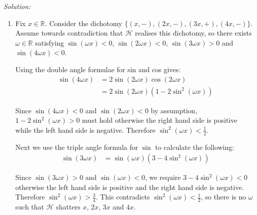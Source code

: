 \documentclass[
	10pt, %
	a4paper, %
	oneside, %
	headinclude,footinclude, %
	BCOR5mm, %
]{scrartcl}
\newenvironment{solution}
{\textit{Solution:}}
{}
\begin{document}
\begin{solution}
	\begin{enumerate}[label= (\alph*)]
		\item Fix $x\in\mathbb{R}$. Consider the dichotomy $\{(x, -), (2x, -), (3x, +), (4x, -)\}$. Assume towards contradiction that $\mathcal{H}$ realises this dichotomy, so there exists $\omega\in\mathbb{R}$ satisfying $\sin(\omega x) < 0$, $\sin(2 \omega x) < 0$, $\sin(3 \omega x) > 0$ and $\sin(4 \omega x) < 0$.

		      Using the double angle formulae for sin and cos gives:
		      \begin{align*}
			      \sin(4\omega x) & = 2 \sin(2\omega x)\cos(2\omega x)         \\
			                      & = 2\sin(2\omega x) (1 - 2\sin^2(\omega x))
		      \end{align*}

		      Since $\sin(4\omega x) < 0$ and $\sin(2\omega x) < 0$ by assumption, $1 - 2\sin^2(\omega x) > 0$ must hold otherwise the right hand side is positive while the left hand side is negative. Therefore $\sin^2(\omega x) < \frac{1}{2}$.

		      Next we use the triple angle formula for $\sin$ to calculate the following:
		      \begin{align*}
			      \sin(3\omega x) & = \sin(\omega x)(3 - 4\sin^2(\omega x))
		      \end{align*}

		      Since $\sin(3\omega x) > 0$ and $\sin(\omega x) < 0$, we require $3 - 4\sin^2(\omega x) < 0$ otherwise the left hand side is positive and the right hand side is negative. Therefore $\sin^2(\omega x) > \frac{3}{4}$. This contradicts $\sin^2(\omega x) < \frac{1}{2}$, so there is no $\omega$ such that $\mathcal{H}$ shatters $x$, $2x$, $3x$ and $4x$.


\end{enumerate}
\end{solution}
\end{document}
